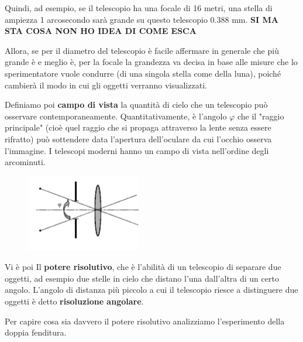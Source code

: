 Quindi, ad esempio, se il telescopio ha una focale di 16 metri, una stella di ampiezza 1 arcosecondo sarà grande su questo telescopio $0.388$ mm. \textbf{SI MA STA COSA NON HO IDEA DI COME ESCA}

Allora, se per il diametro del telescopio è facile affermare in generale che più grande è e meglio è, per la focale la grandezza va decisa in base alle misure che lo sperimentatore vuole condurre (di una singola stella come della luna), poiché cambierà il modo in cui gli oggetti verranno visualizzati.

Definiamo poi \textbf{campo di vista} la quantità di cielo che un telescopio può osservare contemporaneamente. Quantitativamente, è l'angolo $\varphi$ che il "raggio principale" (cioè quel raggio che si propaga attraverso la lente senza essere rifratto) può sottendere data l'apertura dell'oculare da cui l'occhio osserva l'immagine. I telescopi moderni hanno un campo di vista nell'ordine degli arcominuti.

\begin{figure}[H]
    \centering
    \includegraphics[width=5cm]{WhatsApp Image 2023-01-09 at 02.51.58.jpeg}
    \label{fig:my_label7}
\end{figure}

Vi è poi Il \textbf{potere risolutivo}, che è l'abilità di un telescopio di separare due oggetti, ad esempio due stelle in cielo che distano l'una dall'altra di un certo angolo. L'angolo di distanza più piccolo a cui il telescopio riesce a distinguere due oggetti è detto \textbf{risoluzione angolare}.

Per capire cosa sia davvero il potere risolutivo analizziamo l'esperimento della doppia fenditura.

